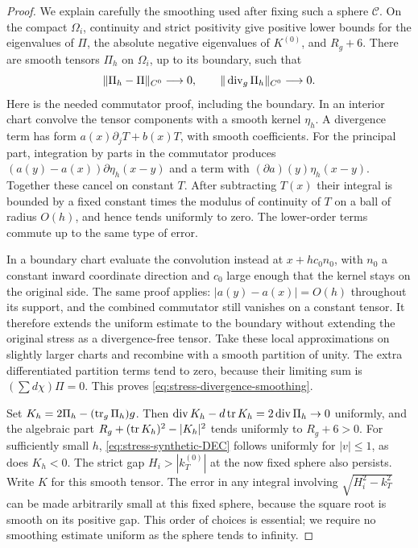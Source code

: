 \begin{proof}
We explain carefully the smoothing used after fixing such a sphere
$\mathcal C$.  On the compact $\Omega_i$, continuity and strict
positivity give positive lower bounds for the eigenvalues of $\Pi$,
the absolute negative eigenvalues of $K^{(0)}$, and $R_g+6$.
There are smooth tensors $\Pi_h$ on $\Omega_i$, up to its boundary,
such that
\begin{equation}
 \|\Pi_h-\Pi\|_{C^0}\longrightarrow0,
 \qquad \|\operatorname{div}_g\Pi_h\|_{C^0}\longrightarrow0.
 \label{eq:stress-divergence-smoothing}
\end{equation}
Here is the needed commutator proof, including the boundary.
In an interior chart convolve the tensor components with a smooth
kernel $\eta_h$.  A divergence term has form
$a(x)\partial_jT+b(x)T$, with smooth coefficients.  For the principal
part, integration by parts in the commutator produces
$(a(y)-a(x))\partial\eta_h(x-y)$ and a term with
$(\partial a)(y)\eta_h(x-y)$.  Together these cancel on constant
$T$.  After subtracting $T(x)$ their integral is bounded by a fixed
constant times the modulus of continuity of $T$ on a ball of radius
$O(h)$, and hence tends uniformly to zero.  The lower-order terms
commute up to the same type of error.

In a boundary chart evaluate the convolution instead at
$x+hc_0n_0$, with $n_0$ a constant inward coordinate direction and
$c_0$ large enough that the kernel stays on the original side.
The same proof applies: $|a(y)-a(x)|=O(h)$ throughout its support,
and the combined commutator still vanishes on a constant tensor.
It therefore extends the uniform estimate to the boundary without
extending the original stress as a divergence-free tensor.  Take
these local approximations on slightly larger charts and recombine
with a smooth partition of unity.  The extra differentiated
partition terms tend to zero, because their limiting sum is
$(\sum d\chi)\Pi=0$.  This proves
\eqref{eq:stress-divergence-smoothing}.

Set $K_h=2\Pi_h-(\operatorname{tr}_g\Pi_h)g$.  Then
$\operatorname{div} K_h-d\operatorname{tr} K_h=2\operatorname{div}\Pi_h\to0$ uniformly, and the algebraic
part $R_g+(\operatorname{tr} K_h)^2-|K_h|^2$ tends uniformly to $R_g+6>0$.
For sufficiently small $h$, \eqref{eq:stress-synthetic-DEC} follows
uniformly for $|v|\le1$, as does $K_h<0$.  The strict gap
$H_i>|k_T^{(0)}|$ at the now fixed sphere also persists.
Write $K$ for this smooth tensor.  The error in any integral
involving $\sqrt{H_i^2-k_T^2}$ can be made arbitrarily small at this
fixed sphere, because the square root is smooth on its positive
gap.  This order of choices is essential; we require no smoothing
estimate uniform as the sphere tends to infinity.


\end{proof}
